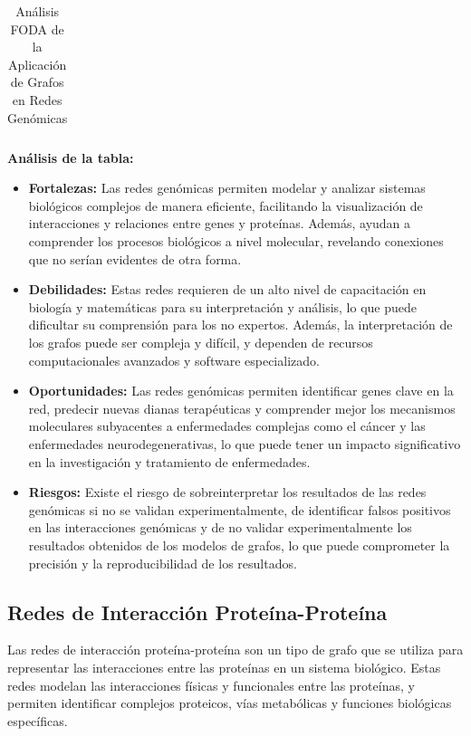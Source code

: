 \documentclass[11pt, a4paper]{article}
\begin{document}
\begin{table}[H]
\begin{tabular}{|l|l|}
  \end{tabular}
  \caption{Análisis FODA de la Aplicación de Grafos en Redes Genómicas}
  \label{tab:foda-redes-genomicas}
\end{table}


\textbf{Análisis de la tabla:}

\begin{itemize}
  \item \textbf{Fortalezas:} Las redes genómicas permiten modelar y analizar sistemas biológicos complejos de manera eficiente, facilitando la visualización de interacciones y relaciones entre genes y proteínas. Además, ayudan a comprender los procesos biológicos a nivel molecular, revelando conexiones que no serían evidentes de otra forma.
  \item \textbf{Debilidades:} Estas redes requieren de un alto nivel de capacitación en biología y matemáticas para su interpretación y análisis, lo que puede dificultar su comprensión para los no expertos. Además, la interpretación de los grafos puede ser compleja y difícil, y dependen de recursos computacionales avanzados y software especializado.
  \item \textbf{Oportunidades:} Las redes genómicas permiten identificar genes clave en la red, predecir nuevas dianas terapéuticas y comprender mejor los mecanismos moleculares subyacentes a enfermedades complejas como el cáncer y las enfermedades neurodegenerativas, lo que puede tener un impacto significativo en la investigación y tratamiento de enfermedades.
  \item \textbf{Riesgos:} Existe el riesgo de sobreinterpretar los resultados de las redes genómicas si no se validan experimentalmente, de identificar falsos positivos en las interacciones genómicas y de no validar experimentalmente los resultados obtenidos de los modelos de grafos, lo que puede comprometer la precisión y la reproducibilidad de los resultados.
\end{itemize}

\newpage
\subsection{Redes de Interacción Proteína-Proteína}

Las redes de interacción proteína-proteína son un tipo de grafo que se utiliza para representar las interacciones entre las proteínas en un sistema biológico. Estas redes modelan las interacciones físicas y funcionales entre las proteínas, y permiten identificar complejos proteicos, vías metabólicas y funciones biológicas específicas.
\end{document}

